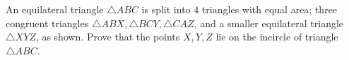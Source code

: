 \begin{problem}
    An equilateral triangle $\bigtriangleup ABC$ is split into $4$ triangles with equal area; three
congruent triangles $\bigtriangleup ABX,\bigtriangleup BCY, \bigtriangleup CAZ$, and a smaller equilateral triangle $\bigtriangleup XYZ$, as shown.
Prove that the points $X, Y, Z$ lie on the incircle of triangle $\bigtriangleup ABC$.

    \label{24IGOA1}
\end{problem}